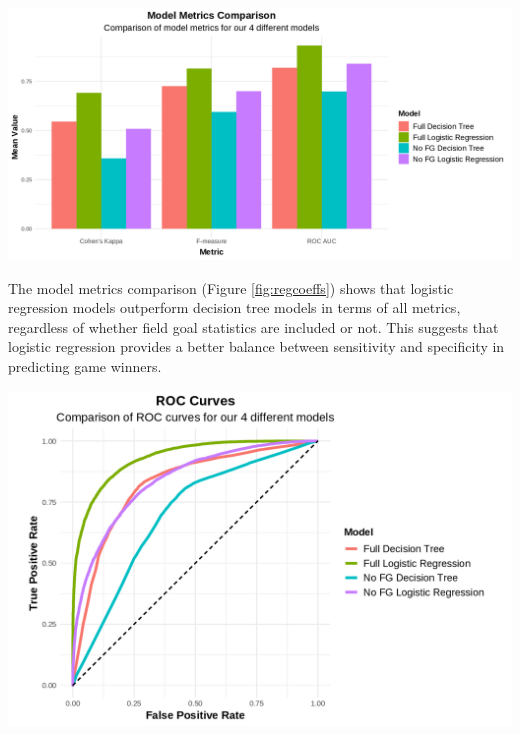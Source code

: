 \documentclass[
  12pt,
  a4paper,
]{article}
\let\origfigure\figure
\let\endorigfigure\endfigure
\renewenvironment{figure}[1][2] {
    \expandafter\origfigure\expandafter[H]
} {
    \endorigfigure
}
\begin{document}
\begin{figure}

{\centering \includegraphics[width=1\linewidth]{latex/plotspng/plot_12} 

}

\caption{Comparison of model metrics for 4 different models}\label{fig:metricsplot}
\end{figure}

The model metrics comparison (Figure \ref{fig:regcoeffs}) shows that logistic regression models outperform decision tree models in terms of all metrics, regardless of whether field goal statistics are included or not. This suggests that logistic regression provides a better balance between sensitivity and specificity in predicting game winners.

\begin{figure}

{\centering \includegraphics[width=1\linewidth]{latex/plotspng/plot_13} 

}

\caption{Comparison of ROC curves for 4 different models}\label{fig:roccurve}
\end{figure}
\end{document}
